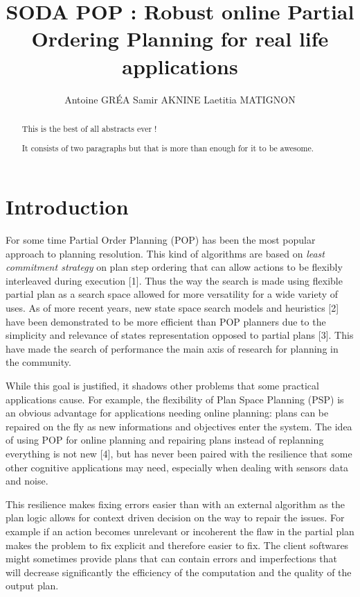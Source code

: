 \documentclass[]{article}
\title{SODA POP : Robust online Partial Ordering Planning for real life
applications}
\author{Antoine GRÉA Samir AKNINE Laetitia MATIGNON}
\date{}
\begin{document}
\maketitle
\begin{abstract}
This is the best of all abstracts ever !

It consists of two paragraphs but that is more than enough for it to be
awesome.
\end{abstract}

\section*{Introduction}\label{introduction}

For some time Partial Order Planning (POP) has been the most popular
approach to planning resolution. This kind of algorithms are based on
\emph{least commitment strategy} on plan step ordering that can allow
actions to be flexibly interleaved during execution {[}1{]}. Thus the
way the search is made using flexible partial plan as a search space
allowed for more versatility for a wide variety of uses. As of more
recent years, new state space search models and heuristics {[}2{]} have
been demonstrated to be more efficient than POP planners due to the
simplicity and relevance of states representation opposed to partial
plans {[}3{]}. This have made the search of performance the main axis of
research for planning in the community.

While this goal is justified, it shadows other problems that some
practical applications cause. For example, the flexibility of Plan Space
Planning (PSP) is an obvious advantage for applications needing online
planning: plans can be repaired on the fly as new informations and
objectives enter the system. The idea of using POP for online planning
and repairing plans instead of replanning everything is not new {[}4{]},
but has never been paired with the resilience that some other cognitive
applications may need, especially when dealing with sensors data and
noise.

This resilience makes fixing errors easier than with an external
algorithm as the plan logic allows for context driven decision on the
way to repair the issues. For example if an action becomes unrelevant or
incoherent the flaw in the partial plan makes the problem to fix
explicit and therefore easier to fix. The client softwares might
sometimes provide plans that can contain errors and imperfections that
will decrease significantly the efficiency of the computation and the
quality of the output plan.
\end{document}
